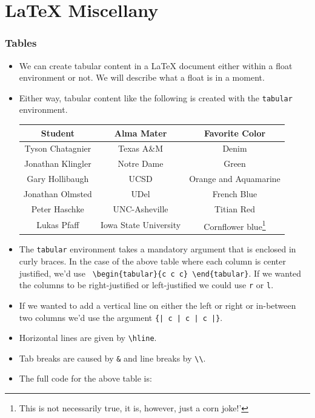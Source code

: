 \part{\LaTeX{} Miscellany}

\section{Tables}
\begin{itemize}
\item We can create tabular content in a \LaTeX{} document either within
  a float environment or not. We will describe what a float is in a moment.
  
\item Either way, tabular content like the following is created with
  the \texttt{tabular} environment.

  \begin{center}
    \begin{tabular}{c c c} 
      \hline 
      \hline
      Student & Alma Mater & Favorite Color \\
      \hline
      Tyson Chatagnier & Texas A\&M & Denim \\
      Jonathan Klingler & Notre Dame & Green \\
      Gary Hollibaugh & UCSD & Orange and Aquamarine \\
      Jonathan Olmsted & UDel & French Blue \\
      Peter Haschke & UNC-Asheville & Titian Red \\
      Lukas Pfaff & Iowa State University & Cornflower blue\footnote{This is not necessarily true, it is, however, just a corn joke!'}\\
      \hline
      \hline
    \end{tabular}
  \end{center}

\item The \texttt{tabular} environment takes a mandatory argument that
  is enclosed in curly braces. In the case of the above table where
  each column is center justified, we'd use
  \verb! \begin{tabular}{c c c} \end{tabular}!. If we wanted the
  columns to be right-justified or left-justified we could use
  \texttt{r} or \texttt{l}.
  \item If we wanted to add a vertical line on either the left or right or in-between two columns we'd use the  argument \verb!{| c | c | c |}!.
  \item Horizontal lines are given by \verb!\hline!.
  \item Tab breaks are caused by \verb!&! and line breaks by \verb!\\!.
  \item The full code for the above table is:\\
    \ovalbox{
      \begin{minipage}{\linewidth}
\begin{verbatim}


\end{verbatim}
\end{minipage}}
\end{itemize}
